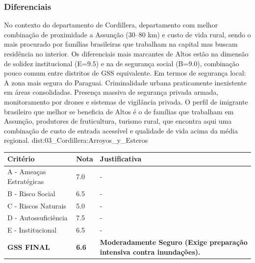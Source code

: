 \subsubsection*{Diferenciais}\label{dif-altos-0302}
No contexto do departamento de Cordillera, departamento com melhor combinação de proximidade a Assunção (30–80 km) e custo de vida rural, sendo o mais procurado por famílias brasileiras que trabalham na capital mas buscam residência no interior. Os diferenciais mais marcantes de Altos estão na dimensão de solidez institucional (E=9.5) e na de segurança social (B=9.0), combinação pouco comum entre distritos de GSS equivalente. Em termos de segurança local: A zona mais segura do Paraguai. Criminalidade urbana praticamente inexistente em áreas consolidadas. Presença massiva de segurança privada armada, monitoramento por drones e sistemas de vigilância privada. O perfil de imigrante brasileiro que melhor se beneficia de Altos é o de famílias que trabalham em Assunção, produtores de fruticultura, turismo rural, que encontra aqui uma combinação de custo de entrada acessível e qualidade de vida acima da média regional.
{dist:03_Cordillera:Arroyos_y_Esteros}
\begin{table}[ht!]
\small \begin{tabular}{p{3.0cm}p{0.8cm}p{6.0cm}} \toprule
\textbf{Critério} & \textbf{Nota} & \textbf{Justificativa} \\ \midrule
A - Ameaças Estratégicas & 7.0 & - \\
B - Risco Social & 6.5 & - \\
C - Riscos Naturais & 5.0 & - \\
D - Autossuficiência & 7.5 & - \\
E - Institucional & 6.5 & - \\
\midrule \textbf{GSS FINAL} & \textbf{6.6} & \textbf{Moderadamente Seguro (Exige preparação intensiva contra inundações).} \\ \bottomrule \end{tabular}
\end{table}
